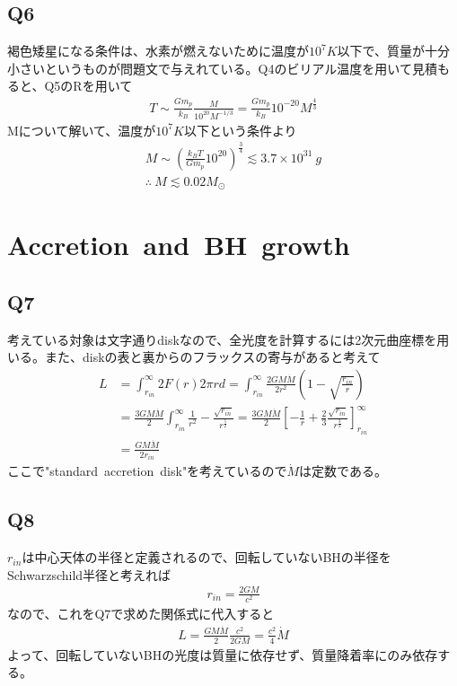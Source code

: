 \subsection{Q6}
褐色矮星になる条件は、水素が燃えないために温度が$10^7K$以下で、質量が十分小さいというものが問題文で与えれている。Q4のビリアル温度を用いて見積もると、Q5のRを用いて
\begin{align*}
    T\sim\frac{Gm_p}{k_B}\frac{M}{10^{20}M^{-1/3}}=\frac{Gm_p}{k_B}10^{-20}M^{\frac{4}{3}}
\end{align*}
Mについて解いて、温度が$10^7K$以下という条件より
\begin{align}
    M\sim\left(\frac{k_BT}{Gm_p}10^{20}\right)^{\frac{3}{4}}\lesssim3.7\times10^{31}\ g\nonumber\\
    \therefore\ M\lesssim0.02M_{\odot}
\end{align}
\section{Accretion\ and\ BH\ growth}
\subsection{Q7}
考えている対象は文字通りdiskなので、全光度を計算するには2次元曲座標を用いる。また、diskの表と裏からのフラックスの寄与があると考えて
\begin{align}
    L&=\int^{\infty}_{r_{in}}2F(r)2\pi rd=\int^{\infty}_{r_{in}}\frac{2GM\Dot{M}}{2r^2}\left(1-\sqrt{\frac{r_{in}}{r}}\right)\nonumber\\
    &=\frac{3GM\Dot{M}}{2}\int^{\infty}_{r_{in}}\frac{1}{r^2}-\frac{\sqrt{r_{in}}}{r^{\frac{5}{2}}}=\frac{3GM\Dot{M}}{2}\left[-\frac{1}{r}+\frac{2}{3}\frac{\sqrt{r_{in}}}{r^{\frac{3}{2}}}\right]^{\infty}_{r_{in}}\nonumber\\
    &=\frac{GM\Dot{M}}{2r_{in}}
\end{align}
ここで"standard\ accretion\ disk"を考えているので$\Dot{M}$は定数である。
\subsection{Q8}
$r_{in}$は中心天体の半径と定義されるので、回転していないBHの半径をSchwarzschild半径と考えれば
\begin{align*}
    r_{in}=\frac{2GM}{c^2}
\end{align*}
なので、これをQ7で求めた関係式に代入すると
\begin{align}
    L=\frac{GM\Dot{M}}{2}\frac{c^2}{2GM}=\frac{c^2}{4}\Dot{M}
\end{align}
よって、回転していないBHの光度は質量に依存せず、質量降着率にのみ依存する。
